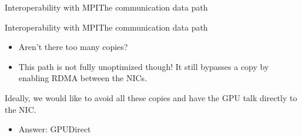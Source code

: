 \documentclass[12pt,aspectratio=169]{beamer}
\begin{document}
\begin{frame}{Interoperability with MPI}{The communication data path}
\begin{figure}
{    }
  \end{figure}
\end{frame}

\begin{frame}{Interoperability with MPI}{The communication data path}
  \begin{itemize}
  \item Aren't there too many copies?
  \item This path is not fully unoptimized though! It still bypasses a copy by enabling RDMA between the NICs.
  \end{itemize}
  \pause
  \vfill
  Ideally, we would like to avoid all these copies and have the GPU talk directly to the NIC.
  \begin{itemize}
  \item Answer: GPUDirect
  \end{itemize}
\end{frame}
\end{document}
